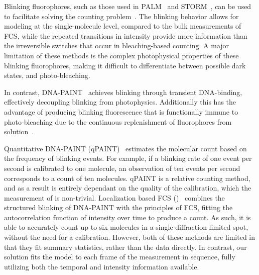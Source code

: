 %
Blinking fluorophores, such as those used in
PALM~\citep{sengupta_pcPALM_2011,lee_counting_2012} and
STORM~\citep{patel_blinking_2021}, can be used to facilitate solving the counting
problem~\citep{rollins_stochastic_2015,nino_2017}.
  The blinking behavior allows for modeling at the single-molecule level, compared 
  to the bulk measurements of FCS, while the repeated transitions in
  intensity provide more information than the irreversible switches that occur 
  in bleaching-based counting.
  A major limitation of these methods is the complex photophysical properties of 
  these blinking fluorophores, making it difficult to differentiate between possible 
  dark states, and photo-bleaching. 

%
In contrast, DNA-PAINT~\citep{schnitzbauer_2017} achieves blinking through transient 
DNA-binding, effectively decoupling blinking from photophysics. Additionally this has 
the advantage of producing blinking fluorescence that is functionally immune to 
photo-bleaching due to the continuous replenishment of fluorophores from 
solution~\citep{stehr_2021}.

  Quantitative DNA-PAINT (qPAINT)~\citep{jungmann_2016} estimates the molecular
  count based on the frequency of blinking events. For example, if a blinking rate of one
  event per second is calibrated to one molecule, an observation of
  ten events per second corresponds to a count of ten molecules. 
  qPAINT is a relative counting method, and as a result is entirely dependant on the quality of 
  the calibration, which the measurement of is non-trivial.
  Localization based FCS (\lbfcs)~\citep{stein_2019,stein_2021} combines the
  structured blinking of DNA-PAINT with the principles of FCS, fitting the
  autocorrelation function of intensity over time to produce a count. As such,
  it is able to accurately count up to six molecules in a single diffraction
  limited spot, without the need for a calibration.
  However, both of these methods are limited in that they fit summary
  statistics, rather than the data directly.
  In contrast, our solution fits the model to each frame of the measurement 
  in sequence, fully utilizing both the temporal and intensity information available.
  
